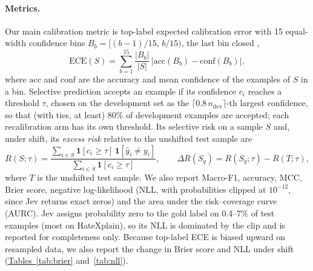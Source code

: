 \paragraph{Metrics.}
Our main calibration metric is top-label expected calibration error with 15 equal-width confidence bins
$B_b=[(b-1)/15,\,b/15)$, the last bin closed \citep{guo2017calibration},
\begin{equation}
  \mathrm{ECE}(S)=\sum_{b=1}^{15}\frac{|B_b|}{|S|}\,\bigl|\mathrm{acc}(B_b)-\mathrm{conf}(B_b)\bigr|,
  \label{eq:ece}
\end{equation}
where $\mathrm{acc}$ and $\mathrm{conf}$ are the accuracy and mean confidence of the examples of $S$ in a bin. Selective
prediction accepts an example if its confidence $c_i$ reaches a threshold $\tau$, chosen on the development set as the
$\lceil 0.8\,n_{\mathrm{dev}}\rceil$-th largest confidence, so that (with ties, at least) 80\% of development examples are
accepted; each recalibration arm has its own threshold. Its selective risk \citep{geifman2017selective} on a sample $S$ and, under
shift, its \emph{excess risk} relative to the unshifted test sample are
\begin{equation}
  R(S;\tau)=\frac{\sum_{i\in S}\mathbf{1}[c_i\ge\tau]\,\mathbf{1}[\hat y_i\neq y_i]}{\sum_{i\in S}\mathbf{1}[c_i\ge\tau]},
  \qquad
  \Delta R(S_q)=R(S_q;\tau)-R(T;\tau),
  \label{eq:risk}
\end{equation}
where $T$ is the unshifted test sample. We also report Macro-F1, accuracy, MCC, Brier score, negative log-likelihood
(NLL, with probabilities clipped at $10^{-12}$, since Jev returns exact zeros) and the area under the risk--coverage
curve (AURC). Jev assigns probability zero to the gold label on 0.4--7\% of test examples (most on HateXplain), so its
NLL is dominated by the clip and is reported for completeness only. Because top-label ECE is biased upward on resampled data, we also report the change in Brier score and NLL
under shift (\hyperref[tab:brier]{Tables~\ref*{tab:brier}} and~\ref{tab:nll}).

